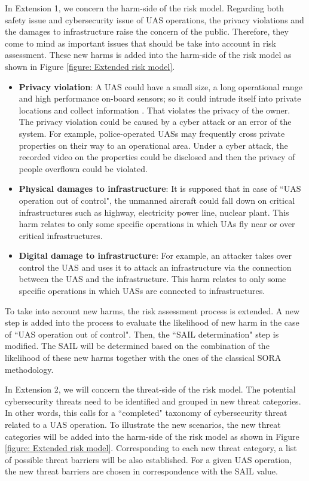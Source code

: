 \documentclass[a4paper, 10, conference]{ieeeconf}  %
\begin{document}
In Extension 1, we concern the harm-side of the risk model. Regarding both safety issue and cybersecurity issue of UAS operations, the privacy violations and the damages to infrastructure raise the concern of the public\cite{A-NPA2015, SORAV1,EASA_SORA,7383633}. Therefore, they come to mind as important issues that should be take into account in risk assessment. These new harms is added into the harm-side of the risk model as shown in Figure \ref{figure: Extended risk model}. 
\begin{itemize}
    \item \textbf{Privacy violation}: A UAS could have a small size, a long operational range and high performance on-board sensors; so it could intrude itself into private locations and collect information \cite{8490190}. That violates the privacy of the owner.  The privacy violation could be caused by a cyber attack or an error of the system. For example, police-operated UASs may frequently cross private properties on their way to an operational area. Under a cyber attack, the recorded video on the properties could be disclosed and then the privacy of people overflown could be violated.  
    
    \item \textbf{Physical damages to infrastructure}: It is supposed that in case of ``UAS operation out of control", the unmanned aircraft could fall down on critical infrastructures such as highway, electricity power line, nuclear plant. This harm relates to only some specific operations in which UAs fly near or over critical infrastructures.
    
    \item \textbf{Digital damage to infrastructure}:  For example, an attacker takes over control the UAS and uses it to attack an infrastructure via the connection between the UAS and the infrastructure. This harm relates to only some specific operations in which UASs are connected to infrastructures.    
    
    
\end{itemize}

To take into account new harms, the risk assessment process is extended. A new step is added into the process to evaluate the likelihood of new harm in the case of ``UAS operation out of control". Then, the ``SAIL determination" step is modified. The SAIL will be determined based on the combination of the likelihood of these new harms together with the ones of the classical SORA methodology. 

In Extension 2, we will concern the threat-side of the risk model. The potential cybersecurity threats need to be identified and grouped in new threat categories. In other words, this calls for a ``completed" taxonomy of cybersecurity threat related to a UAS operation. To illustrate the new scenarios, the new threat categories will be added into the harm-side of the risk model as shown in Figure \ref{figure: Extended risk model}. Corresponding to each new threat category, a list of possible threat barriers will be also established. For a given UAS operation, the new threat barriers are chosen in correspondence with the SAIL value. 
\end{document}
